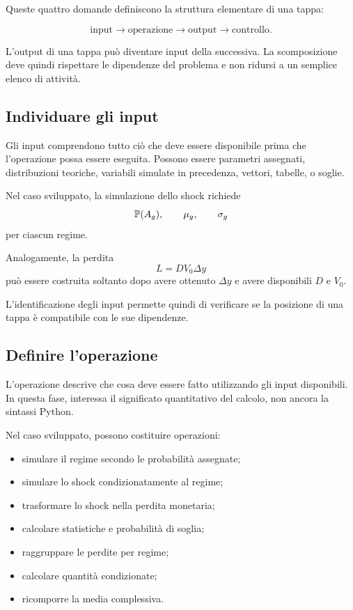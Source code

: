 Queste quattro domande definiscono la struttura elementare di una tappa:

\[
\text{input}
\longrightarrow
\text{operazione}
\longrightarrow
\text{output}
\longrightarrow
\text{controllo}.
\]

L'output di una tappa pu\`{o} diventare input della successiva. La
scomposizione deve quindi rispettare le dipendenze del problema e non ridursi
a un semplice elenco di attivit\`{a}.

\subsection{Individuare gli input}

Gli input comprendono tutto ci\`{o} che deve essere disponibile prima che
l'operazione possa essere eseguita. Possono essere parametri assegnati,
distribuzioni teoriche, variabili simulate in precedenza, vettori, tabelle, o
soglie.

Nel caso sviluppato, la simulazione dello shock richiede
\[
\mathbb{P}(A_g),\qquad
\mu_g,\qquad
\sigma_g
\]
per ciascun regime.

Analogamente, la perdita
\[
L=D V_0\Delta y
\]
pu\`{o} essere costruita soltanto dopo avere ottenuto $\Delta y$ e avere
disponibili $D$ e $V_0$.

L'identificazione degli input permette quindi di verificare se la posizione
di una tappa \`{e} compatibile con le sue dipendenze.

\subsection{Definire l'operazione}

L'operazione descrive che cosa deve essere fatto utilizzando gli input
disponibili. In questa fase, interessa il significato quantitativo del calcolo,
non ancora la sintassi Python.

Nel caso sviluppato, possono costituire operazioni:

\begin{itemize}
\item simulare il regime secondo le probabilit\`{a} assegnate;

\item simulare lo shock condizionatamente al regime;

\item trasformare lo shock nella perdita monetaria;

\item calcolare statistiche e probabilit\`{a} di soglia;

\item raggruppare le perdite per regime;

\item calcolare quantit\`{a} condizionate;

\item ricomporre la media complessiva.
\end{itemize}

